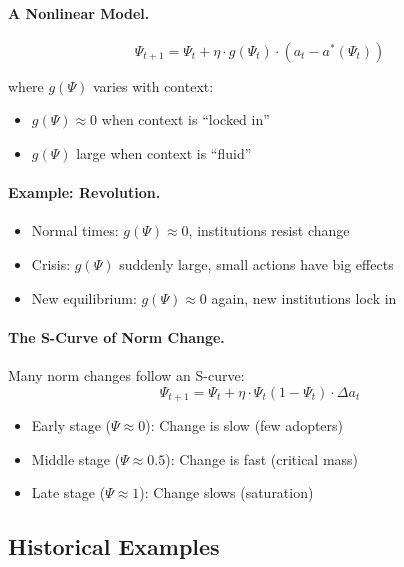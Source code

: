 \documentclass[12pt,a4paper]{article}
\begin{document}
\paragraph{A Nonlinear Model.}
\begin{equation}
  \Psi_{t+1} = \Psi_t + \eta \cdot g(\Psi_t) \cdot (a_t - a^*(\Psi_t))
\end{equation}

where $g(\Psi)$ varies with context:
\begin{itemize}
  \item $g(\Psi) \approx 0$ when context is ``locked in''
  \item $g(\Psi)$ large when context is ``fluid''
\end{itemize}

\paragraph{Example: Revolution.}
\begin{itemize}
  \item Normal times: $g(\Psi) \approx 0$, institutions resist change
  \item Crisis: $g(\Psi)$ suddenly large, small actions have big effects
  \item New equilibrium: $g(\Psi) \approx 0$ again, new institutions lock in
\end{itemize}

\paragraph{The S-Curve of Norm Change.}
Many norm changes follow an S-curve:
\begin{equation}
  \Psi_{t+1} = \Psi_t + \eta \cdot \Psi_t (1 - \Psi_t) \cdot \Delta a_t
\end{equation}

\begin{itemize}
  \item Early stage ($\Psi \approx 0$): Change is slow (few adopters)
  \item Middle stage ($\Psi \approx 0.5$): Change is fast (critical mass)
  \item Late stage ($\Psi \approx 1$): Change slows (saturation)
\end{itemize}

\subsection{Historical Examples}
\end{document}

